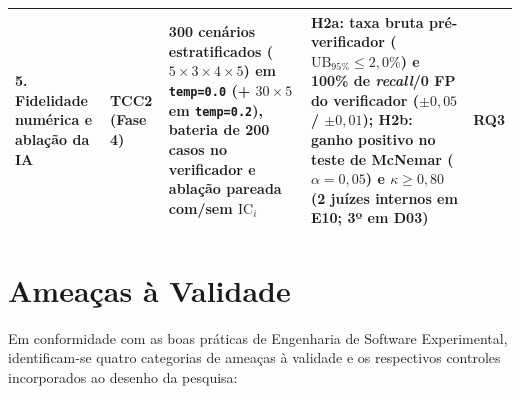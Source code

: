 \documentclass[12pt,openany,oneside,a4paper,english,brazilian,sumario=tradicional]{abntex2}
\newcommand{\fonteautores}{\par\vspace{1mm}{\small Fonte: Elaborado pelos autores (2026).}}
\newcommand{\IC}{\mathrm{IC}}
\begin{document}
\begin{table}[htbp]
\begin{tabularx}{\textwidth}{L{2.2cm} L{1.3cm} Y Y p{0.8cm}}
5. Fidelidade numérica e ablação da IA & TCC2 (Fase 4) & 300 cenários estratificados ($5\times 3\times 4\times 5$) em \texttt{temp=0.0} (+ $30\times 5$ em \texttt{temp=0.2}), bateria de 200 casos no verificador e ablação pareada com/sem $\IC_i$ & H2a: taxa bruta pré-verificador ($\mathrm{UB}_{95\%} \le 2{,}0\%$) e 100\% de \textit{recall}/0 FP do verificador ($\pm 0{,}05$ / $\pm 0{,}01$); H2b: ganho positivo no teste de McNemar ($\alpha=0{,}05$) e $\kappa \ge 0{,}80$ (2 juízes internos em E10; 3º em D03) & RQ3\\
\bottomrule
\end{tabularx}
\fonteautores
\end{table}

\section{Ameaças à Validade}\label{sec:ameacas_validade}

Em conformidade com as boas práticas de Engenharia de Software Experimental, identificam-se quatro categorias de ameaças à validade e os respectivos controles incorporados ao desenho da pesquisa:
\end{document}
